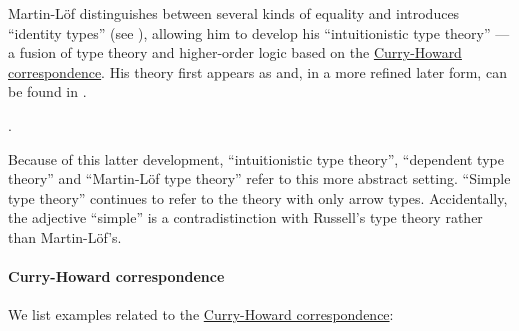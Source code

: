 \begin{concept}\label{con:identity_types}

  Martin-L\"of distinguishes between several kinds of equality and introduces \enquote{identity types} (see ), allowing him to develop his \enquote{intuitionistic type theory} --- a fusion of type theory and higher-order logic based on the \hyperref[con:curry_howard_correspondence]{Curry-Howard correspondence}. His theory first appears as \cite{MartinLöf1975IntuitionisticTypeTheory} and, in a more refined later form, can be found in \cite{MartinLöf1984IntuitionisticTypeTheory}.
\end{concept}

\begin{concept}\label{con:dependent_types}

  .
\end{concept}

\begin{remark}\label{rem:dependent_type_theory}
  Because of this latter development, \enquote{intuitionistic type theory}, \enquote{dependent type theory} and \enquote{Martin-L\"of type theory} refer to this more abstract setting. \enquote{Simple type theory} continues to refer to the theory with only arrow types. Accidentally, the adjective \enquote{simple} is a contradistinction with Russell's type theory rather than Martin-L\"of's.
\end{remark}

\paragraph{Curry-Howard correspondence}\hfill

\begin{example}\label{ex:con:curry_howard_correspondence}
  We list examples related to the \hyperref[con:curry_howard_correspondence]{Curry-Howard correspondence}:
  \begin{thmenum}
  \end{thmenum}
\end{example}

\begin{algorithm}\label{alg:type_derivation_to_proof_tree}
\end{algorithm}

\begin{algorithm}\label{alg:proof_tree_to_type_derivation}
\end{algorithm}
